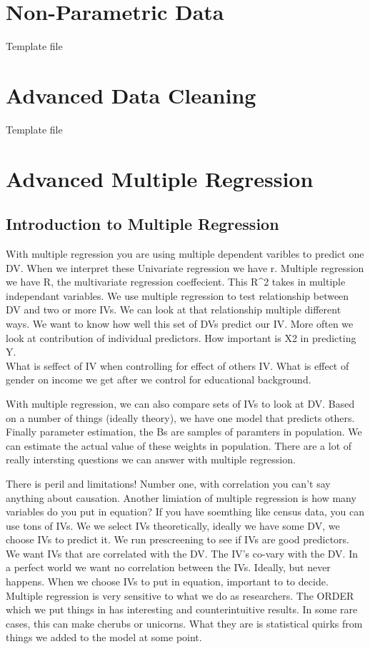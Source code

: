 \documentclass[]{book}
\theoremstyle{definition}
\theoremstyle{definition}
\theoremstyle{definition}
\theoremstyle{remark}
\begin{document}
\chapter{Non-Parametric Data}\label{non-parametric-data}

Template file

\chapter{Advanced Data Cleaning}\label{advanced-data-cleaning}

Template file

\chapter{Advanced Multiple
Regression}\label{advanced-multiple-regression}

\section{Introduction to Multiple
Regression}\label{introduction-to-multiple-regression}

With multiple regression you are using multiple dependent varibles to
predict one DV. When we interpret these Univariate regression we have r.
Multiple regression we have R, the multivariate regression coeffecient.
This R\^{}2 takes in multiple independant variables. We use multiple
regression to test relationship between DV and two or more IVs. We can
look at that relationship multiple different ways. We want to know how
well this set of DVs predict our IV. More often we look at contribution
of individual predictors. How important is X2 in predicting Y.\\
What is seffect of IV when controlling for effect of others IV. What is
effect of gender on income we get after we control for educational
background.

With multiple regression, we can also compare sets of IVs to look at DV.
Based on a number of things (ideally theory), we have one model that
predicts others. Finally parameter estimation, the Bs are samples of
paramters in population. We can estimate the actual value of these
weights in population. There are a lot of really intersting questions we
can answer with multiple regression.

There is peril and limitations! Number one, with correlation you can't
say anything about causation. Another limiation of multiple regression
is how many variables do you put in equation? If you have soemthing like
census data, you can use tons of IVs. We we select IVs theoretically,
ideally we have some DV, we choose IVs to predict it. We run
prescreening to see if IVs are good predictors. We want IVs that are
correlated with the DV. The IV's co-vary with the DV. In a perfect world
we want no correlation between the IVs. Ideally, but never happens. When
we choose IVs to put in equation, important to to decide. Multiple
regression is very sensitive to what we do as researchers. The ORDER
which we put things in has interesting and counterintuitive results. In
some rare cases, this can make cherubs or unicorns. What they are is
statistical quirks from things we added to the model at some point.
\end{document}
